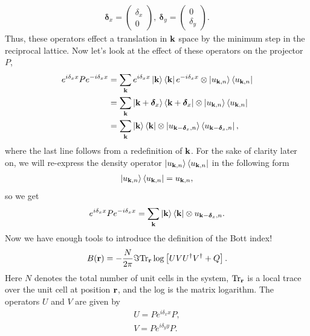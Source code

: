 \begin{align}
	\boldsymbol \delta_x = \begin{pmatrix}
	\delta_x \\
	0
	\end{pmatrix}, \ \boldsymbol \delta_y = \begin{pmatrix}
	0 \\
	\delta_y
	\end{pmatrix}.
\end{align}
Thus, these operators effect a translation in $\textbf k$ space by the minimum step in the reciprocal lattice. Now let's look at the effect of these operators on the projector $ P$,
\begin{align}
	e^{i \delta_x  x}  P e^{-i \delta_x  x}  
	&=  \sum_{\textbf k} e^{i \delta_x  x}  \ket{\textbf k} \bra{\textbf k} e^{-i \delta_x  x}\otimes \ket{u_{\textbf k, n}}\bra{u_{\textbf k, n}} \\
	&=  \sum_{\textbf k} \ket{\textbf k +\boldsymbol{\delta}_x} \bra{\textbf k +\boldsymbol{\delta}_x } \otimes \ket{u_{\textbf k, n}}\bra{u_{\textbf k, n}} \\
	&=  \sum_{\textbf k} \ket{\textbf k } \bra{\textbf k } \otimes \ket{u_{\textbf k-\boldsymbol{\delta}_x, n}}\bra{u_{\textbf k-\boldsymbol{\delta}_x , n}},
\end{align}
where the last line follows from a redefinition of $\textbf k$. For the sake of clarity later on, we will re-express the density operator $\ket{u_{\textbf k, n}}\bra{u_{\textbf k, n}}$ in the following form
\begin{align}
	\ket{u_{\textbf k, n}}\bra{u_{\textbf k, n}} =  u_{\textbf k, n},
\end{align}
so we get
\begin{align} \label{eqn:p_identity}
	e^{i \delta_x  x}  P e^{-i \delta_x  x}  =  \sum_{\textbf k} \ket{\textbf k } \bra{\textbf k } \otimes  u_{\textbf k-\boldsymbol{\delta}_x, n}.
\end{align}
Now we have enough tools to introduce the definition of the Bott index!
\begin{align}\label{eqn:bott_index}
    B(\textbf r) =
	-\frac{N}{2\pi} \Im 
	\textup{Tr}_{\textbf r} \log \left [  U V U^\dag  V^\dag +  Q \right ].
\end{align}
Here $N$ denotes the total number of unit cells in the system, $\textup{Tr}_{\textbf r}$ is a local trace over the unit cell at position $\textbf r$, and the log is the matrix logarithm. The operators $U$ and $V$ are given by
\begin{align}
	 U  =  P e^{i \delta_x  x}  P, \\
	 V  =  P e^{i \delta_y  y}  P.
\end{align}
